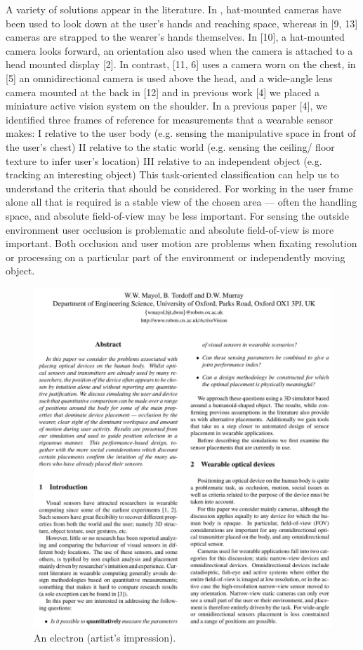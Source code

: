 A variety of solutions appear in the literature. In \cite{starner1998real, schiele1999attentional}, hat-mounted cameras have been used to look down at the user’s hands and reaching space, whereas in [9, 13] cameras are strapped to the wearer’s hands themselves. In [10], a hat-mounted camera looks forward, an orientation also used when the camera is attached to a head mounted display [2]. In contrast, [11, 6] uses a camera worn on the chest, in [5] an omnidirectional camera is used above the head, and a wide-angle lens camera mounted at the back in [12] and in previous work [4] we placed a miniature active vision system on the shoulder.
In a previous paper [4], we identified three frames of reference for measurements that a wearable sensor makes: I relative to the user body (e.g. sensing the manipulative space in front of the user’s chest) II relative to the static world (e.g. sensing the ceiling/
floor texture to infer user’s location)
III relative to an independent object (e.g. tracking an interesting
object)
This task-oriented classification can help us to understand
the criteria that should be considered. For working
in the user frame alone all that is required is a stable view
of the chosen area — often the handling space, and absolute
field-of-view may be less important. For sensing the
outside environment user occlusion is problematic and absolute
field-of-view is more important. Both occlusion and
user motion are problems when fixating resolution or processing
on a particular part of the environment or independently
moving object.


\begin{figure}[htbp]
	\centering
		\includegraphics[page=3]{Figures/mayol_etal_ouel224101_cropped.pdf}
	\caption[An Electron]{An electron (artist's impression).}
	\label{fig:Electron}
\end{figure}

